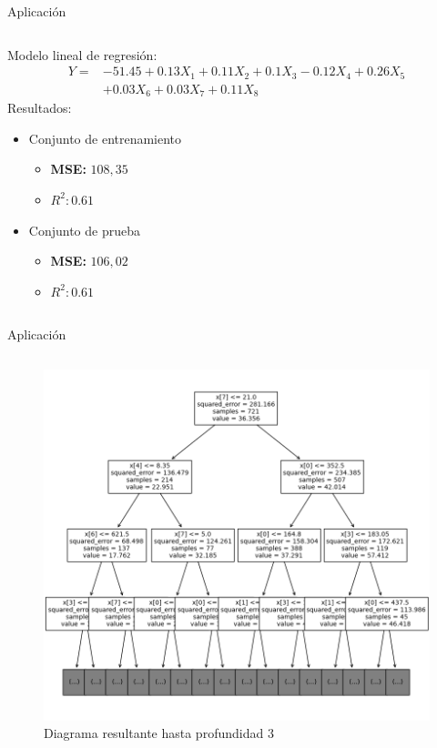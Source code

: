 \begin{frame}{Aplicación}
\begin{columns}
\begin{column}{0.9\textwidth}
Modelo lineal de regresión:
\begin{equation}
\begin{split}
Y=&-51.45+0.13 X_1+0.11X_2+0.1X_3-0.12X_4+0.26X_5\\&+  0.03X_6+0.03X_7+0.11X_8
\end{split}
\end{equation}
Resultados: 
\begin{itemize}
\item Conjunto de entrenamiento
\begin{itemize}
\item \textbf{MSE: }$108,35$
\item $R^2: 0.61$
\end{itemize}
\item Conjunto de prueba
\begin{itemize}
\item \textbf{MSE: }$106,02$
\item $R^2:0.61$
\end{itemize}
\end{itemize}
\end{column}
\end{columns}
\end{frame}

\begin{frame}{Aplicación}
\begin{columns}
\begin{column}{0.9\textwidth}
\begin{figure}[h]
  \centering
  \includegraphics[scale=0.33]{Documentos Extra/Imagenes/Arbol.png}
  \caption{Diagrama resultante hasta profundidad 3}
  \label{fig:diagrama arbol}
\end{figure}
  
\end{column}
\end{columns}
\end{frame}

